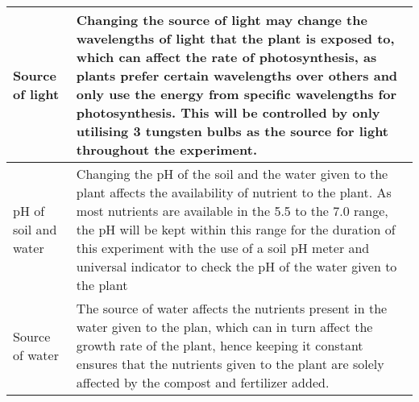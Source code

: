 \documentclass[11pt, a4]{article}
\begin{document}
\begin{longtable}{|>{\centering\arraybackslash}m{4.5cm}|>{\centering\arraybackslash}m{10.5cm}|}
				\hline
				Source of light & Changing the source of light may change the wavelengths of light that the plant is exposed to, which can affect the rate of photosynthesis, as plants prefer certain wavelengths over others and only use the energy from specific wavelengths for photosynthesis. This will be controlled by only utilising 3 tungsten bulbs as the source for light throughout the experiment.\\
				\hline
				pH of soil and water & Changing the pH of the soil and the water given to the plant affects the availability of nutrient to the plant. As most nutrients are available in the 5.5 to the 7.0 range, the pH will be kept within this range for the duration of this experiment with the use of a soil pH meter and universal indicator to check the pH of the water given to the plant\\
				\hline
				Source of water & The source of water affects the nutrients present in the water given to the plan, which can in turn affect the growth rate of the plant, hence keeping it constant ensures that the nutrients given to the plant are solely affected by the compost and fertilizer added.\\
					\hline
			\end{longtable}
\end{document}
